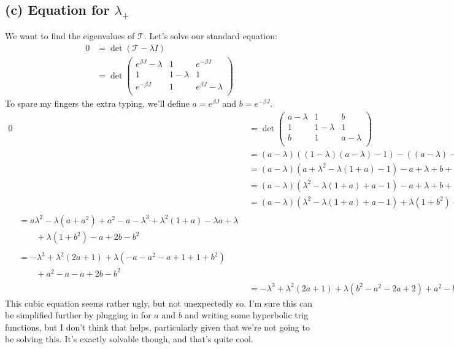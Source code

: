 \documentclass[../../PS3.tex]{subfiles}
\newcommand{\trm}{\mathcal{T}}
\begin{document}
\subsection*{(c) Equation for $\lambda_+$}
We want to find the eigenvalues of $\trm$. Let's solve our standard equation:
\begin{align}
	0 &= \det(\trm - \lambda I)\\
	&= \det \begin{pmatrix}
		 e^{\beta  J } - \lambda & 1 & e^{-\beta  J } \\
		  1 & 1-\lambda & 1 \\
		  e^{-\beta  J } & 1 & e^{\beta  J } -\lambda \\
		\end{pmatrix}
\end{align}
To spare my fingers the extra typing, we'll define $a = e^{\beta  J }$ and $b = e^{-\beta  J}$.
\begin{align}
	0 &= \det \begin{pmatrix}
		 a - \lambda & 1 & b \\
		  1 & 1-\lambda & 1 \\
		  b & 1 & a -\lambda \\
		\end{pmatrix} \\
	&= \left(a - \lambda \right) \left( (1-\lambda)(a - \lambda) - 1 \right) - \left(  (a  - \lambda) - b  \right) + b \left(1 - \left(1 - \lambda \right) b \right) \\
	&= \left(a - \lambda \right) \left( a + \lambda ^2 - \lambda(1 + a) - 1 \right) - a  + \lambda + b + b \left(1 - b + b \lambda  \right) \\
	&= \left(a - \lambda \right) \left(\lambda ^2  - \lambda(1 + a) + a  - 1 \right) - a  + \lambda + b + b - b^2 + b^2 \lambda \\
	&= \left(a - \lambda \right) \left(\lambda ^2  - \lambda(1 + a) + a  - 1 \right) +\lambda (1 + b^2)  - a  + 2 b - b^2 \\
   \begin{split}&= a \lambda^2 - \lambda(a + a^2) + a^2 - a -\lambda^3 + \lambda^2(1 + a) - \lambda a + \lambda \\ &\qquad+\lambda (1 + b^2)  - a  + 2 b - b^2\end{split} \\
   \begin{split}&= -\lambda^3 + \lambda^2\left(2a + 1\right) + \lambda \left( -a - a^2 -a + 1 + 1 + b^2\right) \\ &\qquad+ a^2 - a - a + 2b - b^2\end{split} \\
   &= -\lambda^3 + \lambda^2\left(2a + 1\right) + \lambda \left(b^2 - a^2 -2a + 2\right)+ a^2 - b^2 - 2a + 2b
\end{align}
This cubic equation seems rather ugly, but not unexpectedly so. I'm sure this can be simplified further by plugging in for $a$ and $b$ and writing some hyperbolic trig functions, but I don't think that helps, particularly given that we're not going to be solving this. It's exactly solvable though, and that's quite cool.
\end{document}
